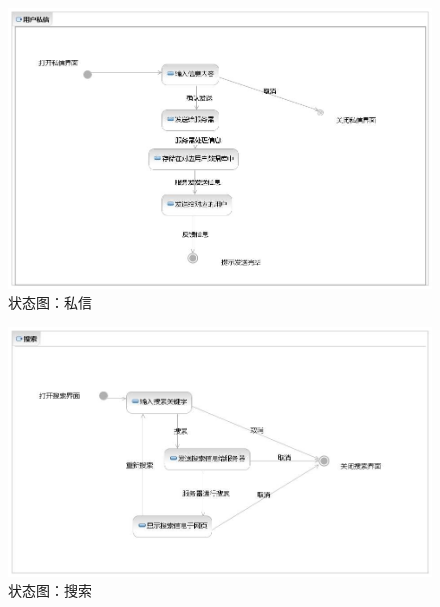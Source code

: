 \documentclass[a4paper,14pt]{ctexart}
\begin{document}
\begin{figure}[H]
\centering\includegraphics[width=4.5in]{状态图-私信.jpeg}
\caption{状态图：私信}
\end{figure}

\begin{figure}[H]
\centering\includegraphics[width=4.5in]{状态图-搜索.jpeg}
\caption{状态图：搜索}
\end{figure}
\end{document}
